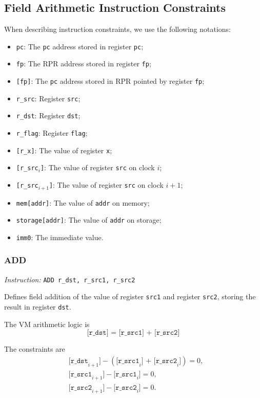 \subsection{Field Arithmetic Instruction Constraints} \label{subsec:field-arithmetic-constraints}

When describing instruction constraints, we use the following notations:
\begin{itemize}
    \item \verb|pc|: The \verb|pc| address stored in register \verb|pc|;
    \item \verb|fp|: The RPR address stored in register \verb|fp|;
    \item \verb|[fp]|: The \verb|pc| address stored in RPR pointed by register \verb|fp|;
    \item \verb|r_src|: Register \verb|src|;
    \item \verb|r_dst|: Register \verb|dst|;
    \item \verb|r_flag|: Register \verb|flag|;
    \item \verb|[r_x]|: The value of register \verb|x|;
    \item \verb|[r_src|$_i$\verb|]|: The value of register \verb|src| on clock $i$;
    \item \verb|[r_src|$_{i+1}$\verb|]|: The value of register \verb|src| on clock $i+1$;
    \item \verb|mem[addr]|: The value of \verb|addr| on memory;
    \item \verb|storage[addr]|: The value of \verb|addr| on storage;
    \item \verb|imm0|: The immediate value.
\end{itemize}

\subsubsection{ADD}

\emph{Instruction:} \verb|ADD r_dst, r_src1, r_src2|

Defines field addition of the value of register \verb|src1| and register \verb|src2|, storing the result in register \verb|dst|.

The VM arithmetic logic is
\[ \texttt{[r\_dst] = [r\_src1] + [r\_src2]} \]

The constraints are
\begin{align*}
    & \texttt{[r\_dst}_{i+1}\texttt{]} - (\texttt{[r\_src1}_i\texttt{] + [r\_src2}_i\texttt{]}) = 0, \\
    & \texttt{[r\_src1}_{i+1}\texttt{]} - \texttt{[r\_src1}_i\texttt{]} = 0, \\
    & \texttt{[r\_src2}_{i+1}\texttt{]} - \texttt{[r\_src2}_i\texttt{]} = 0.
\end{align*}

